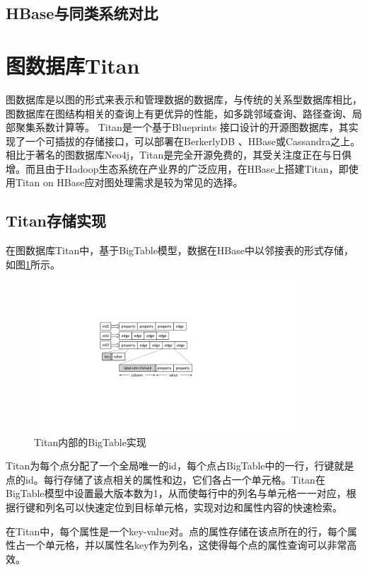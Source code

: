 \subsection{HBase与同类系统对比}

\section{图数据库Titan}
图数据库是以图的形式来表示和管理数据的数据库\supercite{graph_models_survey}，与传统的关系型数据库相比，图数据库在图结构相关的查询上有更优异的性能，如多跳邻域查询、路径查询、局部聚集系数计算等。
Titan是一个基于Blueprints 接口设计的开源图数据库，其实现了一个可插拔的存储接口，可以部署在BerkerlyDB 、HBase或Cassandra之上。相比于著名的图数据库Neo4j，Titan是完全开源免费的，其受关注度正在与日俱增。而且由于Hadoop生态系统在产业界的广泛应用，在HBase上搭建Titan，即使用Titan on HBase应对图处理需求是较为常见的选择。

\subsection{Titan存储实现}
在图数据库Titan中，基于BigTable模型，数据在HBase中以邻接表的形式存储，如图\ref{fig:adj_list}所示。

\begin{figure}[htbp]
\centering
\includegraphics[width=100mm]{fig/adj_list.pdf}
\caption{Titan内部的BigTable实现}
\label{fig:adj_list}
\end{figure}

Titan为每个点分配了一个全局唯一的id，每个点占BigTable中的一行，行键就是点的id。每行存储了该点相关的属性和边，它们各占一个单元格。Titan在BigTable模型中设置最大版本数为1，从而使每行中的列名与单元格一一对应，根据行键和列名可以快速定位到目标单元格，实现对边和属性内容的快速检索。

在Titan中，每个属性是一个key-value对。点的属性存储在该点所在的行，每个属性占一个单元格，并以属性名key作为列名，这使得每个点的属性查询可以非常高效。


